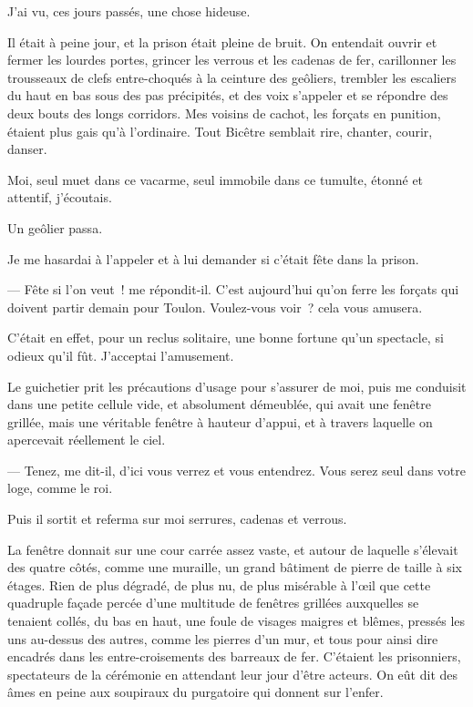 \documentclass[french,twoside]{book} %
\begin{document}
\noindent J’ai vu, ces jours passés, une chose hideuse.\par
Il était à peine jour, et la prison était pleine de bruit. On entendait ouvrir et fermer les lourdes portes, grincer les verrous et les cadenas de fer, carillonner les trousseaux de clefs entre-choqués à la ceinture des geôliers, trembler les escaliers du haut en bas sous des pas précipités, et des voix s’appeler et se répondre des deux bouts des longs corridors. Mes voisins de cachot, les forçats en punition, étaient plus gais qu’à l’ordinaire. Tout Bicêtre semblait rire, chanter, courir, danser.\par
Moi, seul muet dans ce vacarme, seul immobile dans ce tumulte, étonné et attentif, j’écoutais.\par
Un geôlier passa.\par
Je me hasardai à l’appeler et à lui demander si c’était fête dans la prison.\par
— Fête si l’on veut ! me répondit-il. C’est aujourd’hui qu’on ferre les forçats qui doivent partir  demain pour Toulon. Voulez-vous voir ? cela vous amusera.\par
C’était en effet, pour un reclus solitaire, une bonne fortune qu’un spectacle, si odieux qu’il fût. J’acceptai l’amusement.\par
Le guichetier prit les précautions d’usage pour s’assurer de moi, puis me conduisit dans une petite cellule vide, et absolument démeublée, qui avait une fenêtre grillée, mais une véritable fenêtre à hauteur d’appui, et à travers laquelle on apercevait réellement le ciel.\par
— Tenez, me dit-il, d’ici vous verrez et vous entendrez. Vous serez seul dans votre loge, comme le roi.\par
Puis il sortit et referma sur moi serrures, cadenas et verrous.\par
La fenêtre donnait sur une cour carrée assez vaste, et autour de laquelle s’élevait des quatre côtés, comme une muraille, un grand bâtiment de pierre de taille à six étages. Rien de plus dégradé, de plus nu, de plus misérable à l’œil que cette quadruple façade percée d’une multitude de fenêtres grillées auxquelles se tenaient collés, du bas en haut, une foule de visages maigres et blêmes, pressés les uns au-dessus des autres, comme les pierres d’un mur, et tous pour ainsi dire encadrés dans les entre-croisements des barreaux de fer. C’étaient les prisonniers, spectateurs de la cérémonie en attendant leur jour d’être acteurs. On eût dit des âmes en peine aux soupiraux du purgatoire qui donnent sur l’enfer.\par
\end{document}
